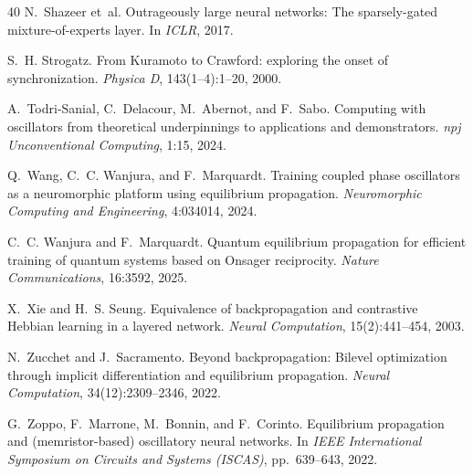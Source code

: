 \documentclass[11pt,a4paper]{article}
\begin{document}
\begin{thebibliography}{40}
N.~Shazeer et~al.
\newblock Outrageously large neural networks: The sparsely-gated
  mixture-of-experts layer.
\newblock In \emph{ICLR}, 2017.

S.~H. Strogatz.
\newblock From {K}uramoto to {C}rawford: exploring the onset of synchronization.
\newblock \emph{Physica D}, 143(1--4):1--20, 2000.

A.~Todri-Sanial, C.~Delacour, M.~Abernot, and F.~Sabo.
\newblock Computing with oscillators from theoretical underpinnings to
  applications and demonstrators.
\newblock \emph{npj Unconventional Computing}, 1:15, 2024.

Q.~Wang, C.~C. Wanjura, and F.~Marquardt.
\newblock Training coupled phase oscillators as a neuromorphic platform using
  equilibrium propagation.
\newblock \emph{Neuromorphic Computing and Engineering}, 4:034014, 2024.

C.~C. Wanjura and F.~Marquardt.
\newblock Quantum equilibrium propagation for efficient training of quantum
  systems based on {O}nsager reciprocity.
\newblock \emph{Nature Communications}, 16:3592, 2025.

X.~Xie and H.~S. Seung.
\newblock Equivalence of backpropagation and contrastive {H}ebbian learning in
  a layered network.
\newblock \emph{Neural Computation}, 15(2):441--454, 2003.

N.~Zucchet and J.~Sacramento.
\newblock Beyond backpropagation: Bilevel optimization through implicit
  differentiation and equilibrium propagation.
\newblock \emph{Neural Computation}, 34(12):2309--2346, 2022.

G.~Zoppo, F.~Marrone, M.~Bonnin, and F.~Corinto.
\newblock Equilibrium propagation and (memristor-based) oscillatory neural
  networks.
\newblock In \emph{IEEE International Symposium on Circuits and Systems
  (ISCAS)}, pp.~639--643, 2022.

\end{thebibliography}
\end{document}
